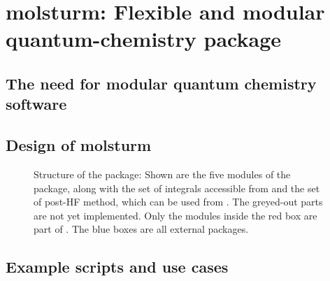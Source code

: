 \chapter{molsturm: Flexible and modular quantum-chemistry package}

\section{The need for modular quantum chemistry software}

\section{Design of molsturm}
\begin{figure}
	\centering
	\caption[Structure of the \molsturm package]{%
	Structure of the \molsturm package: Shown are the five modules of the package,
	along with the set of integrals accessible from \gint and the set of post-HF method,
	which can be used from \molsturm. The greyed-out parts are not yet implemented.
	Only the modules inside the red box are part of \molsturm. The blue boxes are all external packages.}
	\label{fig:structureMolsturm}
\end{figure}




\section{Example scripts and use cases}
